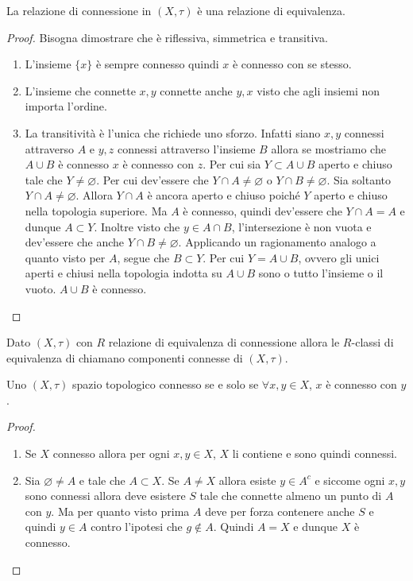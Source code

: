 \begin{lemma}
	La relazione di connessione in $(X, \tau)$ è una relazione di equivalenza. 
\end{lemma} 
\begin{proof}
	Bisogna dimostrare che è riflessiva, simmetrica e transitiva.
	\begin{enumerate}
		\item	L'insieme $\{x\}$ è sempre connesso quindi $x$ è connesso con se stesso.
		\item L'insieme che connette $x,y$ connette anche $y,x$ visto che agli insiemi non importa l'ordine.
		\item La transitività è l'unica che richiede uno sforzo. Infatti siano $x,y$ connessi attraverso $A$ e $y,z$ connessi attraverso l'insieme $B$ allora se mostriamo che $A \cup B$ è connesso $x$ è connesso con $z$. Per cui sia $Y \subset A \cup B$ aperto e chiuso tale che $Y \neq \varnothing$. Per cui dev'essere che $Y \cap A \neq \varnothing$ o $Y \cap B \neq \varnothing$. Sia soltanto $Y \cap A \neq \varnothing$. Allora $Y \cap A$ è ancora aperto e chiuso poiché $Y$ aperto e chiuso nella topologia superiore. Ma $A$ è connesso, quindi dev'essere che $Y \cap A = A$ e dunque $A \subset Y$. Inoltre visto che $y\in A \cap B$, l'intersezione è non vuota e dev'essere che anche $Y \cap B \neq \varnothing$. Applicando un ragionamento analogo a quanto visto per $A$, segue che $B \subset Y$. Per cui $Y = A \cup B$, ovvero gli unici aperti e chiusi nella topologia indotta su $A \cup B$ sono o tutto l'insieme o il vuoto. $A \cup B$ è connesso.
	\end{enumerate}
\end{proof}

\begin{definition}
	Dato $(X, \tau)$ con $R$ relazione di equivalenza di connessione allora le $R$-classi di equivalenza di chiamano componenti connesse di $(X, \tau)$.
\end{definition} 

\begin{theorem}
	\label{thr:3.21.4}
	Uno $(X, \tau)$ spazio topologico connesso se e solo se $\forall x, y \in X$, $x$ è connesso con $y$.
\end{theorem} 
\begin{proof}
	\begin{enumerate}
		\item Se $X$ connesso allora per ogni $x, y \in X$, $X$ li contiene e sono quindi connessi. 
		\item Sia $\varnothing \neq A$ e tale che $A \subset X$. Se $A \neq X$ allora esiste $y \in A^c$ e siccome ogni $x, y$ sono connessi allora deve esistere $S$ tale che connette almeno un punto di $A$ con $y$. Ma per quanto visto prima $A$ deve per forza contenere anche $S$ e quindi $y \in A$ contro l'ipotesi che $g \notin A$. Quindi $A = X$ e dunque $X$ è connesso. 
	\end{enumerate}
\end{proof}

